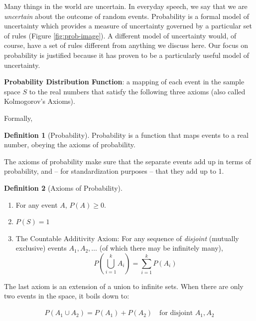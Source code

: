 \documentclass[
]{book}
\providecommand{\tightlist}{%
  \setlength{\itemsep}{0pt}\setlength{\parskip}{0pt}}
\theoremstyle{definition}
\newtheorem{definition}{Definition}[chapter]
\theoremstyle{definition}
\theoremstyle{definition}
\theoremstyle{definition}
\theoremstyle{remark}
\begin{document}
Many things in the world are uncertain. In everyday speech, we say that we are \emph{uncertain} about the outcome of random events. Probability is a formal model of uncertainty which provides a measure of uncertainty governed by a particular set of rules (Figure \ref{fig:prob-image}). A different model of uncertainty would, of course, have a set of rules different from anything we discuss here. Our focus on probability is justified because it has proven to be a particularly useful model of uncertainty.

\textbf{Probability Distribution Function}: a mapping of each event in the sample space \(S\) to the real numbers that satisfy the following three axioms (also called Kolmogorov's Axioms).

Formally,

\begin{definition}[Probability]
\protect\hypertarget{def:unnamed-chunk-253}{}{\label{def:unnamed-chunk-253} {} }
Probability is a function that maps events to a real number, obeying the axioms of probability.
\end{definition}

The axioms of probability make sure that the separate events add up in terms of probability, and -- for standardization purposes -- that they add up to 1.

\begin{definition}[Axioms of Probability]
\protect\hypertarget{def:unnamed-chunk-254}{}{\label{def:unnamed-chunk-254} {} }

\begin{enumerate}
\def\labelenumi{\arabic{enumi}.}
\tightlist
\item
  For any event \(A\), \(P(A)\ge 0\).
\item
  \(P(S)=1\)
\item
  The Countable Additivity Axiom: For any sequence of \emph{disjoint} (mutually exclusive) events \(A_1,A_2,\ldots\) (of which there may be infinitely many), \[P\left( \bigcup\limits_{i=1}^k
  A_i\right)=\sum\limits_{i=1}^k P(A_i)\]
\end{enumerate}

The last axiom is an extension of a union to infinite sets. When there are only two events in the space, it boils down to:

\begin{align*}
P(A_1 \cup A_2) = P(A_1) + P(A_2) \quad\text{for disjoint } A_1, A_2
\end{align*}
\end{definition}
\end{document}
